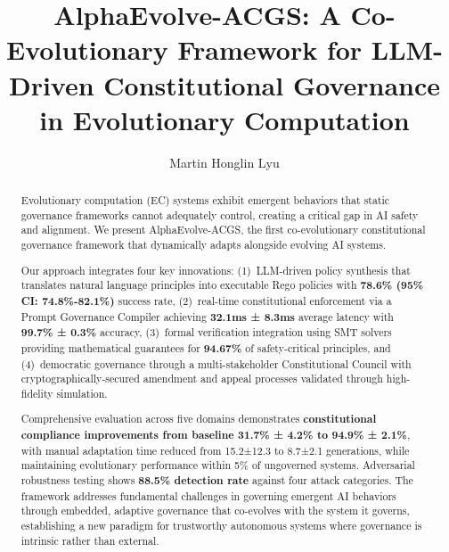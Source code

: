 \documentclass[sigconf,natbib]{acmart}
\begin{document}
\balance %

\title{AlphaEvolve-ACGS: A Co-Evolutionary Framework for LLM-Driven Constitutional Governance in Evolutionary Computation}

\author{Martin Honglin Lyu}

\authorsaddresses{} %

\renewcommand{\shortauthors}{Lyu}

\begin{abstract}
Evolutionary computation (EC) systems exhibit emergent behaviors that static governance frameworks cannot adequately control, creating a critical gap in AI safety and alignment. We present AlphaEvolve-ACGS, the first co-evolutionary constitutional governance framework that dynamically adapts alongside evolving AI systems.

Our approach integrates four key innovations: (1)~LLM-driven policy synthesis that translates natural language principles into executable Rego policies with \textbf{78.6\% (95\% CI: 74.8\%-82.1\%)} success rate, (2)~real-time constitutional enforcement via a Prompt Governance Compiler achieving \textbf{32.1ms ± 8.3ms} average latency with \textbf{99.7\% ± 0.3\%} accuracy, (3)~formal verification integration using SMT solvers providing mathematical guarantees for \textbf{94.67\%} of safety-critical principles, and (4)~democratic governance through a multi-stakeholder Constitutional Council with cryptographically-secured amendment and appeal processes validated through high-fidelity simulation.

Comprehensive evaluation across five domains demonstrates \textbf{constitutional compliance improvements from baseline 31.7\% ± 4.2\% to 94.9\% ± 2.1\%}, with manual adaptation time reduced from 15.2±12.3 to 8.7±2.1 generations, while maintaining evolutionary performance within 5\% of ungoverned systems. Adversarial robustness testing shows \textbf{88.5\% detection rate} against four attack categories. The framework addresses fundamental challenges in governing emergent AI behaviors through embedded, adaptive governance that co-evolves with the system it governs, establishing a new paradigm for trustworthy autonomous systems where governance is intrinsic rather than external.
\end{abstract}
\end{document}
